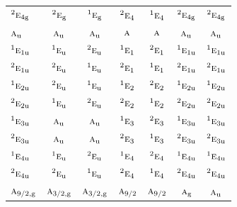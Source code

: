 \documentclass[10pt,a4paper]{article}
\numberwithin{equation}{section}
\newcommand{\irr}[1]{\text{\normalfont\scshape #1}}
\newcommand{\conjpair}[1]{{}^{#1}}
\newcommand{\ptag}[1]{\mathrm{#1}}
\begin{document}
{\begin{longtable}{@{}lcccccc@{}}
$\conjpair{2}\irr{e}_{4\ptag{g}}$ & $\conjpair{2}\irr{e}_{\ptag{g}}$ & $\conjpair{1}\irr{e}_{\ptag{g}}$ & $\conjpair{2}\irr{e}_{4}$ & $\conjpair{1}\irr{e}_{4}$ & $\conjpair{2}\irr{e}_{4\ptag{g}}$ & $\conjpair{2}\irr{e}_{4\ptag{g}}$\\
$\irr{a}_{\ptag{u}}$ & $\irr{a}_{\ptag{u}}$ & $\irr{a}_{\ptag{u}}$ & $\irr{a}$ & $\irr{a}$ & $\irr{a}_{\ptag{u}}$ & $\irr{a}_{\ptag{u}}$\\
$\conjpair{1}\irr{e}_{1\ptag{u}}$ & $\conjpair{1}\irr{e}_{\ptag{u}}$ & $\conjpair{2}\irr{e}_{\ptag{u}}$ & $\conjpair{1}\irr{e}_{1}$ & $\conjpair{2}\irr{e}_{1}$ & $\conjpair{1}\irr{e}_{1\ptag{u}}$ & $\conjpair{1}\irr{e}_{1\ptag{u}}$\\
$\conjpair{2}\irr{e}_{1\ptag{u}}$ & $\conjpair{2}\irr{e}_{\ptag{u}}$ & $\conjpair{1}\irr{e}_{\ptag{u}}$ & $\conjpair{2}\irr{e}_{1}$ & $\conjpair{1}\irr{e}_{1}$ & $\conjpair{2}\irr{e}_{1\ptag{u}}$ & $\conjpair{2}\irr{e}_{1\ptag{u}}$\\
$\conjpair{1}\irr{e}_{2\ptag{u}}$ & $\conjpair{2}\irr{e}_{\ptag{u}}$ & $\conjpair{1}\irr{e}_{\ptag{u}}$ & $\conjpair{1}\irr{e}_{2}$ & $\conjpair{2}\irr{e}_{2}$ & $\conjpair{1}\irr{e}_{2\ptag{u}}$ & $\conjpair{1}\irr{e}_{2\ptag{u}}$\\
$\conjpair{2}\irr{e}_{2\ptag{u}}$ & $\conjpair{1}\irr{e}_{\ptag{u}}$ & $\conjpair{2}\irr{e}_{\ptag{u}}$ & $\conjpair{2}\irr{e}_{2}$ & $\conjpair{1}\irr{e}_{2}$ & $\conjpair{2}\irr{e}_{2\ptag{u}}$ & $\conjpair{2}\irr{e}_{2\ptag{u}}$\\
$\conjpair{1}\irr{e}_{3\ptag{u}}$ & $\irr{a}_{\ptag{u}}$ & $\irr{a}_{\ptag{u}}$ & $\conjpair{1}\irr{e}_{3}$ & $\conjpair{2}\irr{e}_{3}$ & $\conjpair{1}\irr{e}_{3\ptag{u}}$ & $\conjpair{1}\irr{e}_{3\ptag{u}}$\\
$\conjpair{2}\irr{e}_{3\ptag{u}}$ & $\irr{a}_{\ptag{u}}$ & $\irr{a}_{\ptag{u}}$ & $\conjpair{2}\irr{e}_{3}$ & $\conjpair{1}\irr{e}_{3}$ & $\conjpair{2}\irr{e}_{3\ptag{u}}$ & $\conjpair{2}\irr{e}_{3\ptag{u}}$\\
$\conjpair{1}\irr{e}_{4\ptag{u}}$ & $\conjpair{1}\irr{e}_{\ptag{u}}$ & $\conjpair{2}\irr{e}_{\ptag{u}}$ & $\conjpair{1}\irr{e}_{4}$ & $\conjpair{2}\irr{e}_{4}$ & $\conjpair{1}\irr{e}_{4\ptag{u}}$ & $\conjpair{1}\irr{e}_{4\ptag{u}}$\\
$\conjpair{2}\irr{e}_{4\ptag{u}}$ & $\conjpair{2}\irr{e}_{\ptag{u}}$ & $\conjpair{1}\irr{e}_{\ptag{u}}$ & $\conjpair{2}\irr{e}_{4}$ & $\conjpair{1}\irr{e}_{4}$ & $\conjpair{2}\irr{e}_{4\ptag{u}}$ & $\conjpair{2}\irr{e}_{4\ptag{u}}$\\
$\irr{a}_{9/2,\ptag{g}}$ & $\irr{a}_{3/2,\ptag{g}}$ & $\irr{a}_{3/2,\ptag{g}}$ & $\irr{a}_{9/2}$ & $\irr{a}_{9/2}$ & $\irr{a}_{\ptag{g}}$ & $\irr{a}_{\ptag{u}}$\\

\end{longtable}}
\end{document}
